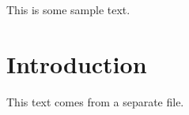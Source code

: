 This is some sample text.

\section{Introduction}
This text comes from a separate file.
\newcommand{\mytextB}{This is my sample text.}